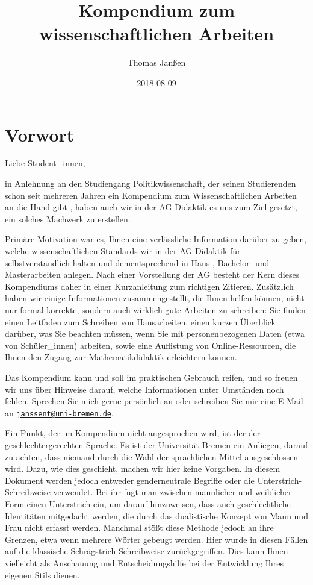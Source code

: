 \documentclass[ngerman,oneside,12pt,a4paper]{scrbook}
\title{Kompendium zum wissenschaftlichen Arbeiten}
\author{Thomas Janßen}
\date{2018-08-09}
\begin{document}
\maketitle

{
\setcounter{tocdepth}{1}
\tableofcontents
}
\chapter*{Vorwort}\label{vorwort}

Liebe Student\_innen,

in Anlehnung an den Studiengang Politikwissenschaft, der seinen
Studierenden schon seit mehreren Jahren ein Kompendium zum
Wissenschaftlichen Arbeiten an die Hand gibt
\autocite{autorengruppe2012}, haben auch wir in der AG Didaktik es uns
zum Ziel gesetzt, ein solches Machwerk zu erstellen.

Primäre Motivation war es, Ihnen eine verlässliche Information darüber
zu geben, welche wissenschaftlichen Standards wir in der AG Didaktik für
selbstverständlich halten und dementsprechend in Haus-, Bachelor- und
Masterarbeiten anlegen. Nach einer Vorstellung der AG besteht der Kern
dieses Kompendiums daher in einer Kurzanleitung zum richtigen Zitieren.
Zusätzlich haben wir einige Informationen zusammengestellt, die Ihnen
helfen können, nicht nur formal korrekte, sondern auch wirklich gute
Arbeiten zu schreiben: Sie finden einen Leitfaden zum Schreiben von
Hausarbeiten, einen kurzen Überblick darüber, was Sie beachten müssen,
wenn Sie mit personenbezogenen Daten (etwa von Schüler\_innen) arbeiten,
sowie eine Auflistung von Online-Ressourcen, die Ihnen den Zugang zur
Mathematikdidaktik erleichtern können.

Das Kompendium kann und soll im praktischen Gebrauch reifen, und so
freuen wir uns über Hinweise darauf, welche Informationen unter
Umständen noch fehlen. Sprechen Sie mich gerne persönlich an oder
schreiben Sie mir eine E-Mail an
\href{mailto:janssent@uni-bremen.de}{\nolinkurl{janssent@uni-bremen.de}}.

Ein Punkt, der im Kompendium nicht angesprochen wird, ist der der
geschlechtergerechten Sprache. Es ist der Universität Bremen ein
Anliegen, darauf zu achten, dass niemand durch die Wahl der sprachlichen
Mittel ausgeschlossen wird. Dazu, wie dies geschieht, machen wir hier
keine Vorgaben. In diesem Dokument werden jedoch entweder genderneutrale
Begriffe oder die Unterstrich-Schreibweise verwendet. Bei ihr fügt man
zwischen männlicher und weiblicher Form einen Unterstrich ein, um darauf
hinzuweisen, dass auch geschlechtliche Identitäten mitgedacht werden,
die durch das dualistische Konzept von Mann und Frau nicht erfasst
werden. Manchmal stößt diese Methode jedoch an ihre Grenzen, etwa wenn
mehrere Wörter gebeugt werden. Hier wurde in diesen Fällen auf die
klassische Schrägstrich-Schreibweise zurückgegriffen. Dies kann Ihnen
vielleicht als Anschauung und Entscheidungshilfe bei der Entwicklung
Ihres eigenen Stils dienen.
\end{document}
